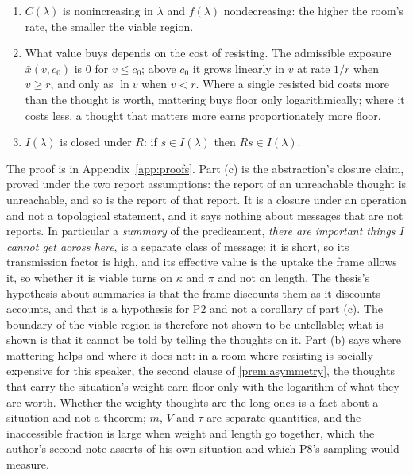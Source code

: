\begin{proposition}\label{prop:region}
\begin{enumerate}[label=(\alph*)]
\item $C(\lambda)$ is nonincreasing in $\lambda$ and $f(\lambda)$ nondecreasing: the higher the room's rate, the smaller the viable region.
\item What value buys depends on the cost of resisting. The admissible exposure $\bar{x}(v, c_0)$ is $0$ for $v \le c_0$; above $c_0$ it grows linearly in $v$ at rate $1/r$ when $v \ge r$, and only as $\ln v$ when $v < r$. Where a single resisted bid costs more than the thought is worth, mattering buys floor only logarithmically; where it costs less, a thought that matters more earns proportionately more floor.
\item $I(\lambda)$ is closed under $R$: if $s \in I(\lambda)$ then $Rs \in I(\lambda)$.
\end{enumerate}
\end{proposition}

The proof is in Appendix~\ref{app:proofs}. Part (c) is the abstraction's closure claim, proved under the two report assumptions: the report of an unreachable thought is unreachable, and so is the report of that report. It is a closure under an operation and not a topological statement, and it says nothing about messages that are not reports. In particular a \emph{summary} of the predicament, \emph{there are important things I cannot get across here}, is a separate class of message: it is short, so its transmission factor is high, and its effective value is the uptake the frame allows it, so whether it is viable turns on $\kappa$ and $\pi$ and not on length. The thesis's hypothesis about summaries is that the frame discounts them as it discounts accounts, and that is a hypothesis for P2 and not a corollary of part (c). The boundary of the viable region is therefore not shown to be untellable; what is shown is that it cannot be told by telling the thoughts on it. Part (b) says where mattering helps and where it does not: in a room where resisting is socially expensive for this speaker, the second clause of \autoref{prem:asymmetry}, the thoughts that carry the situation's weight earn floor only with the logarithm of what they are worth. Whether the weighty thoughts are the long ones is a fact about a situation and not a theorem; $m$, $V$ and $\tau$ are separate quantities, and the inaccessible fraction is large when weight and length go together, which the author's second note asserts of his own situation and which P8's sampling would measure.

